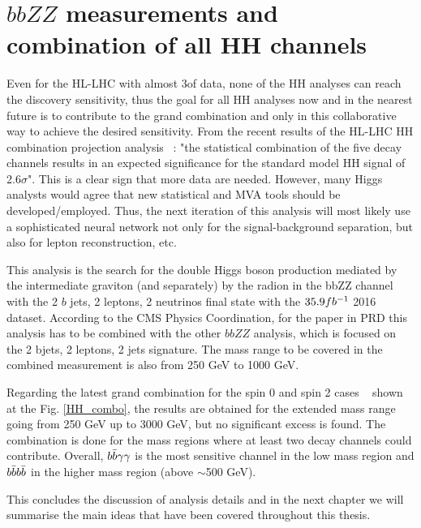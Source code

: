 \chapter{$bbZZ$ measurements and combination of all HH channels}
\label{ch:bbZZcombination}

Even for the HL-LHC with almost 3\abinv of data, none of the HH analyses can reach the discovery sensitivity, thus the goal for all HH analyses now and in the nearest future is to contribute to the grand combination and only in this collaborative way to achieve the desired sensitivity. From the recent results of the HL-LHC HH combination projection analysis ~\cite{CMS-PAS-FTR-18-019}: "the statistical combination of the five decay channels results in an expected significance for the standard model HH signal of 2.6$\sigma$". This is a clear sign that more data are needed. However, many Higgs analysts would agree that new statistical and MVA tools should be developed/employed. Thus, the next iteration of this analysis will most likely use a sophisticated neural network not only for the signal-background separation, but also for lepton reconstruction, etc. 

This analysis is the search for the double Higgs boson production mediated by the intermediate graviton (and separately) by the radion in the bbZZ channel with the 2 $b$ jets, 2 leptons, 2 neutrinos final state with the $35.9fb^{-1}$ 2016 dataset. According to the CMS Physics Coordination, for the paper in PRD this analysis has to be combined with the other $bbZZ$ analysis, which is focused on the 2 bjets, 2 leptons, 2 jets signature. %
The mass range to be covered in the combined measurement is also from 250 GeV to 1000 GeV.

Regarding the latest grand combination for the spin 0 and spin 2 cases ~\cite{CMS-PAS-HIG-17-030} shown at the Fig. \ref{HH_combo}, the results are obtained for the extended mass range going from 250 GeV up to 3000 GeV, but no significant excess is found. The combination is done for the mass regions where at least two decay channels could contribute. Overall, $b\bar{b} \gamma\gamma$ is the most sensitive channel in the low mass region and $b\bar{b} b\bar{b}$ in the higher mass region (above $\sim$500 GeV).

This concludes the discussion of analysis details and in the next chapter we will summarise the main ideas that have been covered throughout this thesis. 


